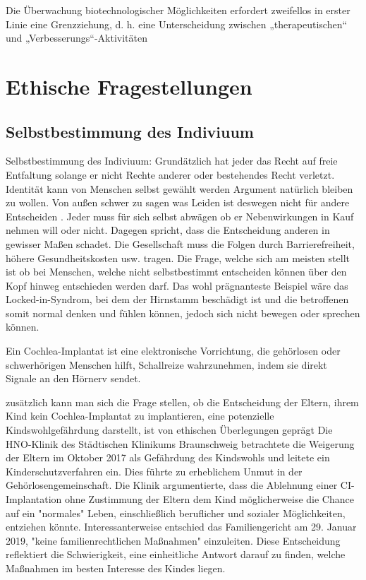 \documentclass[a4paper,
DIV=13,
12pt,
BCOR=10mm,
department=FakEI,
twoside,
parskip=half,
automark,
]{OTHRartcl}
\begin{document}
Die Überwachung biotechnologischer Möglichkeiten erfordert zweifellos in erster Linie eine Grenzziehung, d. h. eine Unterscheidung zwischen „therapeutischen“ und „Verbesserungs“-Aktivitäten \cite{breczko2021human}

\section*{Ethische Fragestellungen}

\subsection*{Selbstbestimmung des Indiviuum}
Selbstbestimmung des Indiviuum: Grundätzlich hat jeder das Recht auf freie Entfaltung solange er nicht Rechte anderer oder bestehendes Recht verletzt\cite{fur1996grundgesetz}. Identität kann von Menschen selbst gewählt werden
Argument natürlich bleiben zu wollen. \cite{lee2016cochlear} Von außen schwer zu sagen was Leiden ist deswegen nicht für andere Entscheiden \cite{plavsienkova2021healthy}. Jeder muss für sich selbst abwägen ob er Nebenwirkungen in Kauf nehmen will oder nicht. Dagegen spricht, dass die Entscheidung anderen in gewisser Maßen schadet. Die Gesellschaft muss die Folgen durch Barrierefreiheit, höhere Gesundheitskosten usw. tragen.
Die Frage, welche sich am meisten stellt ist ob bei Menschen, welche nicht selbstbestimmt entscheiden können über den Kopf hinweg entschieden werden darf. Das wohl prägnanteste Beispiel
wäre das Locked-in-Syndrom, bei dem der Hirnstamm beschädigt ist und die betroffenen somit normal denken und fühlen können, jedoch sich nicht bewegen oder sprechen können.\cite{das2022locked}

Ein Cochlea-Implantat ist eine elektronische Vorrichtung, die gehörlosen oder schwerhörigen Menschen hilft, Schallreize wahrzunehmen, indem sie direkt Signale an den Hörnerv sendet.

zusätzlich kann man sich die Frage stellen, ob die Entscheidung der Eltern, ihrem Kind kein Cochlea-Implantat zu implantieren, eine potenzielle Kindswohlgefährdung darstellt, ist von ethischen Überlegungen geprägt
Die HNO-Klinik des Städtischen Klinikums Braunschweig betrachtete die Weigerung der Eltern im Oktober 2017 als Gefährdung des Kindswohls und leitete ein Kinderschutzverfahren ein. Dies führte zu erheblichem Unmut in der Gehörlosengemeinschaft. Die Klinik 
argumentierte, dass die Ablehnung einer CI-Implantation ohne Zustimmung der Eltern dem Kind möglicherweise die Chance auf ein "normales" Leben, einschließlich beruflicher und sozialer Möglichkeiten, entziehen könnte.
Interessanterweise entschied das Familiengericht am 29. Januar 2019, "keine familienrechtlichen Maßnahmen" einzuleiten. Diese Entscheidung reflektiert die Schwierigkeit, eine einheitliche Antwort darauf zu finden, welche Maßnahmen im besten Interesse des Kindes liegen.
\end{document}
